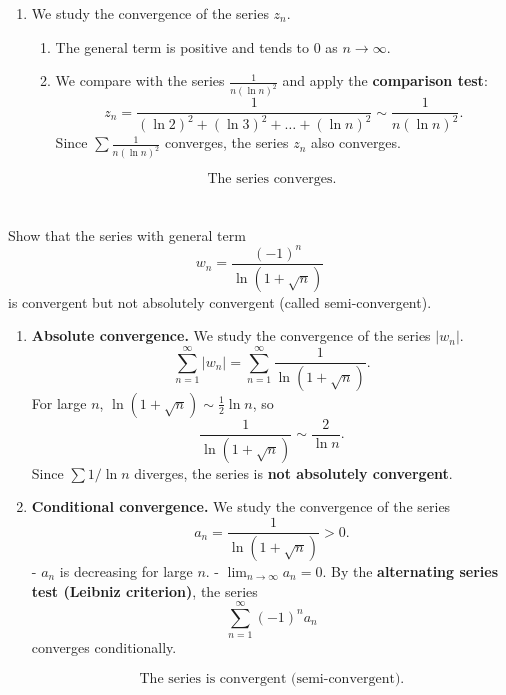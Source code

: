 \documentclass[12pt]{article}
\begin{document}
\begin{correctionbox}
\begin{enumerate}
    \item We study the convergence of the series $z_n$.
    \begin{enumerate}
        \item The general term is positive and tends to 0 as $n \to \infty$.
        \item We compare with the series $\frac{1}{n(\ln n)^2}$ and apply the \textbf{comparison test}:
        \[z_n = \frac{1}{(\ln 2)^2 + (\ln 3)^2 + \dots + (\ln n)^2} \sim \frac{1}{n (\ln n)^2}.\]
        Since $\sum \frac{1}{n (\ln n)^2}$ converges, the series $z_n$ also converges.
    \end{enumerate}
    \[\boxed{\text{The series converges.}}\]
\end{enumerate}
\end{correctionbox}

\section{}
Show that the series with general term
\[
w_n = \frac{(-1)^n}{\ln(1 + \sqrt{n})}
\]
is convergent but not absolutely convergent (called semi-convergent).

\begin{correctionbox}
\begin{enumerate}
    \item \textbf{Absolute convergence.} We study the convergence of the series  $|w_n|$.
    \[
    \sum_{n=1}^{\infty} |w_n| = \sum_{n=1}^{\infty} \frac{1}{\ln(1 + \sqrt{n})}.
    \]
    For large $n$, $\ln(1+\sqrt{n}) \sim \frac{1}{2} \ln n$, so
    \[
    \frac{1}{\ln(1+\sqrt{n})} \sim \frac{2}{\ln n}.
    \]
    Since $\sum 1/\ln n$ diverges, the series is \textbf{not absolutely convergent}.

    \item \textbf{Conditional convergence.} We study the convergence of the series 
    \[
    a_n = \frac{1}{\ln(1+\sqrt{n})} > 0.
    \]
    - $a_n$ is decreasing for large $n$.  
    - $\lim_{n \to \infty} a_n = 0$.
    By the \textbf{alternating series test (Leibniz criterion)}, the series
    \[
    \sum_{n=1}^{\infty} (-1)^n a_n
    \]
    converges conditionally.

    \[\boxed{\text{The series is convergent (semi-convergent).}}\]
\end{enumerate}
\end{correctionbox}

\end{document}
